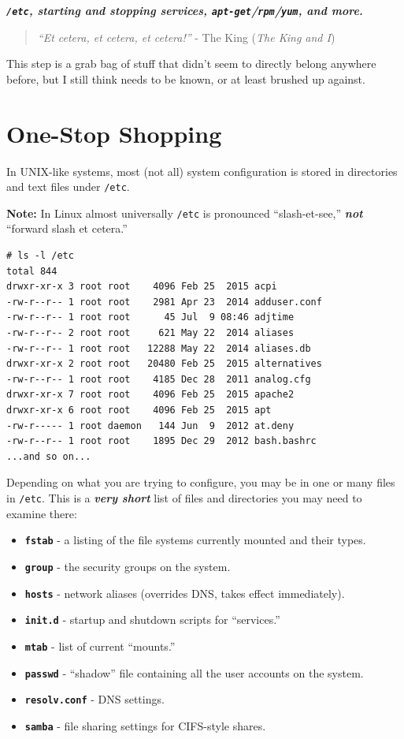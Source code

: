 \documentclass[10pt,]{book}
\numberwithin{figure}{chapter}
\begin{document}
\textbf{\emph{\texttt{/etc}, starting and stopping services,
\texttt{apt-get}/\texttt{rpm}/\texttt{yum}, and more.}}

\begin{quote}
\emph{``Et cetera, et cetera, et cetera!''} - The King (\emph{The King
and I})
\end{quote}

This step is a grab bag of stuff that didn't seem to directly belong
anywhere before, but I still think needs to be known, or at least
brushed up against.

\section{One-Stop Shopping}\label{one-stop-shopping}

In UNIX-like systems, most (not all) system configuration is stored in
directories and text files under \texttt{/etc}.

\textbf{Note:} In Linux almost universally \texttt{/etc} is pronounced
``slash-et-see,'' \textbf{\emph{not}} ``forward slash et cetera.''

\begin{verbatim}
# ls -l /etc
total 844
drwxr-xr-x 3 root root    4096 Feb 25  2015 acpi
-rw-r--r-- 1 root root    2981 Apr 23  2014 adduser.conf
-rw-r--r-- 1 root root      45 Jul  9 08:46 adjtime
-rw-r--r-- 2 root root     621 May 22  2014 aliases
-rw-r--r-- 1 root root   12288 May 22  2014 aliases.db
drwxr-xr-x 2 root root   20480 Feb 25  2015 alternatives
-rw-r--r-- 1 root root    4185 Dec 28  2011 analog.cfg
drwxr-xr-x 7 root root    4096 Feb 25  2015 apache2
drwxr-xr-x 6 root root    4096 Feb 25  2015 apt
-rw-r----- 1 root daemon   144 Jun  9  2012 at.deny
-rw-r--r-- 1 root root    1895 Dec 29  2012 bash.bashrc
...and so on...
\end{verbatim}

Depending on what you are trying to configure, you may be in one or many
files in \texttt{/etc}. This is a \textbf{\emph{very short}} list of
files and directories you may need to examine there:

\begin{itemize}
\item
  \textbf{\texttt{fstab}} - a listing of the file systems currently
  mounted and their types.
\item
  \textbf{\texttt{group}} - the security groups on the system.
\item
  \textbf{\texttt{hosts}} - network aliases (overrides DNS, takes effect
  immediately).
\item
  \textbf{\texttt{init.d}} - startup and shutdown scripts for
  ``services.''
\item
  \textbf{\texttt{mtab}} - list of current ``mounts.''
\item
  \textbf{\texttt{passwd}} - ``shadow'' file containing all the user
  accounts on the system.
\item
  \textbf{\texttt{resolv.conf}} - DNS settings.
\item
  \textbf{\texttt{samba}} - file sharing settings for CIFS-style shares.
\end{itemize}
\end{document}
